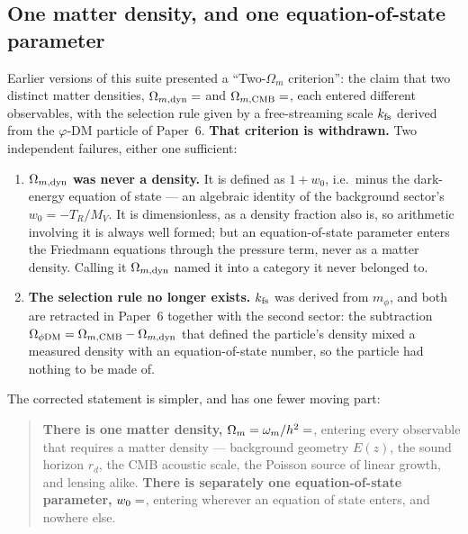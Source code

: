 \documentclass[12pt,a4paper]{article}
\begin{document}
\subsection{One matter density, and one equation-of-state parameter}
\label{sec:two_omega_m}

Earlier versions of this suite presented a ``Two-$\Omega_m$ criterion'': the
claim that two distinct matter densities, $\Omega_{m,\rm dyn}=\val{S_M_d6}$ and
$\Omega_{m,\rm CMB}=\val{OMEGA_M_TOTAL_d6}$, each entered different observables, with the
selection rule given by a free-streaming scale $k_{\rm fs}$ derived from the
$\varphi$-DM particle of Paper~6. \textbf{That criterion is withdrawn.} Two
independent failures, either one sufficient:

\begin{enumerate}\itemsep2pt
  \item \textbf{$\Omega_{m,\rm dyn}$ was never a density.} It is defined as
        $1+w_0$, i.e.\ minus the dark-energy equation of state --- an algebraic
        identity of the background sector's $w_0=-T_R/M_V$. It is
        dimensionless, as a density fraction also is, so arithmetic involving
        it is always well formed; but an equation-of-state parameter enters
        the Friedmann equations through the pressure term, never as a matter
        density. Calling it $\Omega_{m,\rm dyn}$ named it into a category it
        never belonged to.
  \item \textbf{The selection rule no longer exists.} $k_{\rm fs}$ was derived
        from $m_\phi$, and both are retracted in Paper~6 together with the
        second sector: the subtraction
        $\Omega_{\phi\rm DM}=\Omega_{m,\rm CMB}-\Omega_{m,\rm dyn}$ that
        defined the particle's density mixed a measured density with an
        equation-of-state number, so the particle had nothing to be made of.
\end{enumerate}

The corrected statement is simpler, and has one fewer moving part:

\begin{quote}
\textbf{There is one matter density,}
$\Omega_m = \omega_m/h^2 = \val{OMEGA_M_TOTAL_d6}$, entering every observable that requires a
matter density --- background geometry $E(z)$, the sound horizon $r_d$, the CMB
acoustic scale, the Poisson source of linear growth, and lensing alike.
\textbf{There is separately one equation-of-state parameter,} $w_0=\val{W0_d6}$,
entering wherever an equation of state enters, and nowhere else.
\end{quote}
\end{document}
